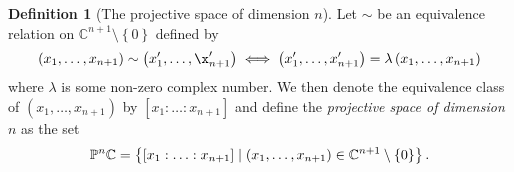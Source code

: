\documentclass[a4paper]{article}
\theoremstyle{definition}
\newtheorem{defn}{Definition}
\newcommand{\C}{\ensuremath{\mathbb{C}}}
\newcommand{\proj}{\ensuremath{\mathbb{P}}}
\begin{document}
    \begin{defn}[The projective space of dimension $n$]
        Let $\sim$ be an equivalence relation on $\C^{n+1} \setminus \left\{ 0
        \right\}$ defined by
        \begin{equation}
            \notag
            \left( x_1, \ldots, x_{n+1} \right) \sim \left( x_1', \ldots,
            \x_{n+1}' \right) \iff \left( x_1', \ldots, x_{n+1}' \right) =
            \lambda \left( x_1, \ldots, x_{n+1} \right)
        \end{equation}
        where $\lambda$ is some non-zero complex number. We then denote the
        equivalence class of $\left( x_1, \ldots, x_{n+1} \right)$ by $\left[
        x_1 : \ldots : x_{n+1} \right]$ and define the \emph{projective space
        of dimension $n$} as the set
        \begin{equation}
            \notag
            \proj^n{\C} = \left\{ \left[ x_1 : \ldots : x_{n+1} \right] \mid
            \left( x_1, \ldots, x_{n+1} \right) \in \C^{n+1} \setminus \left\{
            0 \right\} \right\}.
        \end{equation}
    \end{defn}

\printbibliography
\end{document}
